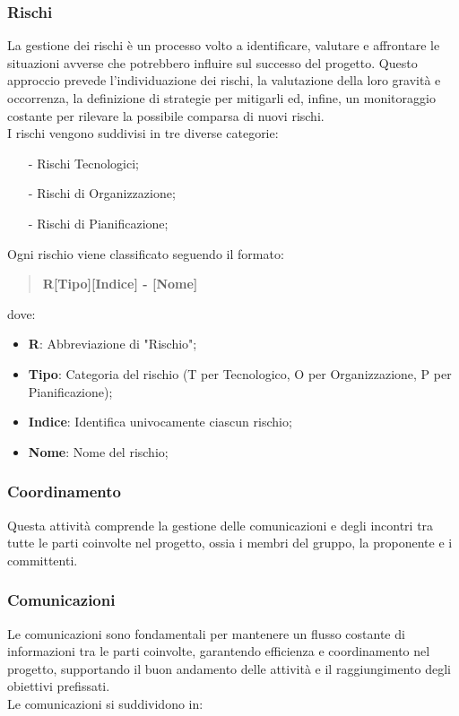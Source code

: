 \documentclass[10pt]{article}
\begin{document}
\begin{justify}
    \subsubsection{Rischi}
    La gestione dei rischi è un processo volto a identificare, valutare e affrontare le situazioni avverse che potrebbero influire sul successo del progetto. Questo approccio prevede l'individuazione dei rischi, la valutazione della loro gravità e occorrenza, la definizione di strategie per mitigarli ed, infine, un monitoraggio costante per rilevare la possibile comparsa di nuovi rischi.\\
    I rischi vengono suddivisi in tre diverse categorie:
    \begin{itemize}
        \item [-] Rischi Tecnologici;
        \item [-] Rischi di Organizzazione;
        \item [-] Rischi di Pianificazione;
    \end{itemize}
    Ogni rischio viene classificato seguendo il formato:
    \begin{quote}
         \textbf{R[Tipo][Indice] - [Nome]}
    \end{quote}
    dove:
    \begin{itemize}
        \item \textbf{R}: Abbreviazione di "Rischio";
        \item \textbf{Tipo}: Categoria del rischio (T per Tecnologico, O per Organizzazione, P per Pianificazione);
        \item \textbf{Indice}: Identifica univocamente ciascun rischio;
        \item \textbf{Nome}: Nome del rischio;
    \end{itemize}

    \subsubsection{Coordinamento}
    Questa attività comprende la gestione delle comunicazioni e degli incontri tra tutte le parti coinvolte nel progetto, ossia i  membri del gruppo, la proponente e i committenti.

    \subsubsection{Comunicazioni}
    Le comunicazioni sono fondamentali per mantenere un flusso costante di informazioni tra le parti coinvolte, garantendo efficienza e coordinamento nel progetto, supportando il buon andamento delle attività e il raggiungimento degli obiettivi prefissati.\\
    Le comunicazioni si suddividono in:


\end{justify}
\end{document}
